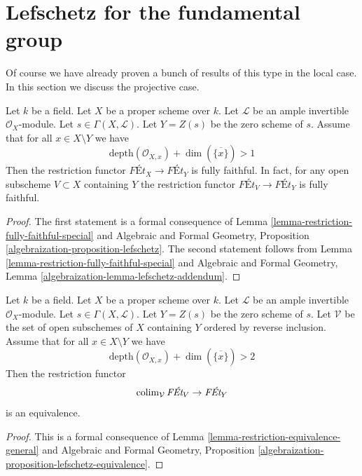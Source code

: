 \section{Lefschetz for the fundamental group}
\label{section-global-lefschetz}

\noindent
Of course we have already proven a bunch of results of this type
in the local case. In this section we discuss the projective case.

\begin{proposition}
\label{proposition-lefschetz-fully-faithful}
Let $k$ be a field. Let $X$ be a proper scheme over $k$.
Let $\mathcal{L}$ be an ample invertible $\mathcal{O}_X$-module.
Let $s \in \Gamma(X, \mathcal{L})$. Let $Y = Z(s)$ be the
zero scheme of $s$. Assume that for all $x \in X \setminus Y$
we have
$$
\text{depth}(\mathcal{O}_{X, x}) + \dim(\overline{\{x\}}) > 1
$$
Then the restriction functor $\textit{F\'Et}_X \to \textit{F\'Et}_Y$
is fully faithful. In fact, for any open subscheme $V \subset X$
containing $Y$ the restriction functor
$\textit{F\'Et}_V \to \textit{F\'Et}_Y$
is fully faithful. 
\end{proposition}

\begin{proof}
The first statement is a formal consequence of
Lemma \ref{lemma-restriction-fully-faithful-special}
and
Algebraic and Formal Geometry, Proposition
\ref{algebraization-proposition-lefschetz}.
The second statement follows from
Lemma \ref{lemma-restriction-fully-faithful-special}
and
Algebraic and Formal Geometry, Lemma
\ref{algebraization-lemma-lefschetz-addendum}.
\end{proof}

\begin{proposition}
\label{proposition-lefschetz-equivalence-general}
Let $k$ be a field. Let $X$ be a proper scheme over $k$.
Let $\mathcal{L}$ be an ample invertible $\mathcal{O}_X$-module.
Let $s \in \Gamma(X, \mathcal{L})$. Let $Y = Z(s)$ be the
zero scheme of $s$. Let $\mathcal{V}$ be the set of open
subschemes of $X$ containing $Y$ ordered by reverse inclusion.
Assume that for all $x \in X \setminus Y$ we have
$$
\text{depth}(\mathcal{O}_{X, x}) + \dim(\overline{\{x\}}) > 2
$$
Then the restriction functor
$$
\mathop{\mathrm{colim}}\nolimits_\mathcal{V} \textit{F\'Et}_V \to \textit{F\'Et}_Y
$$
is an equivalence.
\end{proposition}

\begin{proof}
This is a formal consequence of
Lemma \ref{lemma-restriction-equivalence-general} and
Algebraic and Formal Geometry, Proposition
\ref{algebraization-proposition-lefschetz-equivalence}.
\end{proof}

